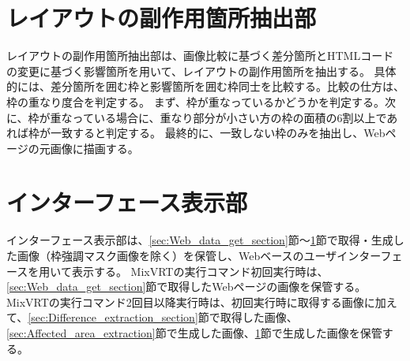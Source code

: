 \section{レイアウトの副作用箇所抽出部}\label{sec:Layout_subEffect_extraction_section}
レイアウトの副作用箇所抽出部は、画像比較に基づく差分箇所とHTMLコードの変更に基づく影響箇所を用いて、レイアウトの副作用箇所を抽出する。
具体的には、差分箇所を囲む枠と影響箇所を囲む枠同士を比較する。比較の仕方は、枠の重なり度合を判定する。
まず、枠が重なっているかどうかを判定する。次に、枠が重なっている場合に、重なり部分が小さい方の枠の面積の6割以上であれば枠が一致すると判定する。
最終的に、一致しない枠のみを抽出し、Webページの元画像に描画する。


\section{インターフェース表示部}\label{sec:Interface_Display_Section}
インターフェース表示部は、\ref{sec:Web_data_get_section}節～\ref{sec:Layout_subEffect_extraction_section}節で取得・生成した画像（枠強調マスク画像を除く）を保管し、Webベースのユーザインターフェースを用いて表示する。
MixVRTの実行コマンド初回実行時は、\ref{sec:Web_data_get_section}節で取得したWebページの画像を保管する。
MixVRTの実行コマンド2回目以降実行時は、初回実行時に取得する画像に加えて、\ref{sec:Difference_extraction_section}節で取得した画像、
\ref{sec:Affected_area_extraction}節で生成した画像、\ref{sec:Layout_subEffect_extraction_section}節で生成した画像を保管する。








